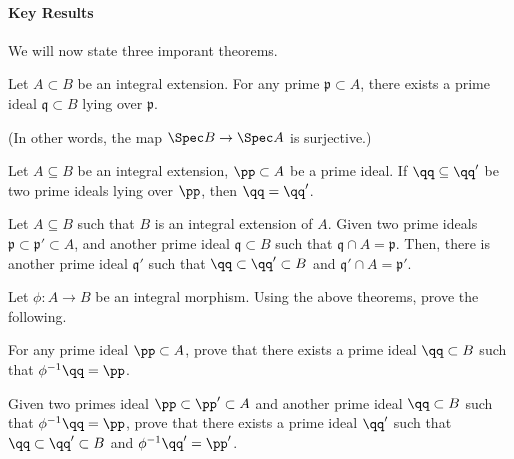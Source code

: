 \paragraph{Key Results}
We will now state three imporant theorems.
\begin{theorem}
    \label{thm:lying_over}
    Let $A\subset B$ be an integral extension.
    For any prime $\mathfrak p\subset A$,
    there exists a prime ideal $\mathfrak q\subset B$
    lying over $\mathfrak p$.
    \begin{center}
    \end{center}
    (In other words, the map $\Spec B\to\Spec A$ is surjective.)
\end{theorem}
\begin{theorem}[Incomparability]
    \label{thm:lying_over_equal}
     Let $A\subseteq B$ be an integral extension,
    $\pp\subset A$ be a prime ideal.
    If $\qq\subseteq\qq'$ be two prime ideals
    lying over $\pp$, then $\qq=\qq'$.
\end{theorem}
\begin{theorem}[Going-up]
    \label{thm:going_up}
    Let $A\subseteq B$ such that $B$ is an
    integral extension of $A$.
    Given two prime ideals
    $\mathfrak p\subset\mathfrak p'\subset A$,
    and another prime ideal $\mathfrak q\subset B$
    such that $\mathfrak q\cap A = \mathfrak p$.
    Then, there is another prime ideal $\mathfrak q'$
    such that 
    $\qq\subset\qq'\subset B$
    and $\mathfrak q'\cap A = \mathfrak p'$.
    \begin{center}
    \end{center}
\end{theorem}
\begin{exercise}
    Let $\phi : A\to B$ be an integral morphism.
    Using the above theorems, prove the following.
    \begin{alphenum}
    \item For any prime ideal $\pp\subset A$,
    prove that there exists a prime ideal $\qq\subset B$
    such that $\phi^{-1}\qq = \pp$.
    \item Given two primes ideal $\pp\subset \pp'\subset A$
    and another prime ideal $\qq\subset B$ such that 
    $\phi^{-1}\qq = \pp$,
    prove that there exists a prime ideal $\qq'$ such that
    $\qq\subset\qq'\subset B$ and $\phi^{-1}\qq' = \pp'$.
    \end{alphenum}
\end{exercise}
